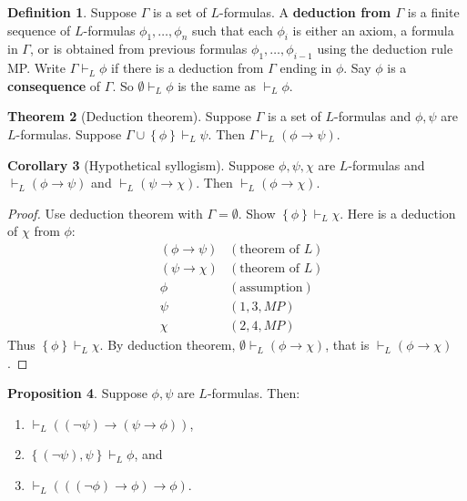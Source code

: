 \documentclass{article}
\newcommand{\rb}[1]{\left( #1 \right)}
\newcommand{\cb}[1]{\left\{ #1 \right\}}
\newcommand{\notb}[1]{\rb{\neg #1}}
\newcommand{\impb}[2]{\rb{#1 \rightarrow #2}}
\theoremstyle{definition}\newtheorem{definition}{Definition}[subsection]
\theoremstyle{definition}\newtheorem{remark}[definition]{Remark}
\theoremstyle{definition}\newtheorem*{example}{Example}
\theoremstyle{definition}\newtheorem*{note}{Note}
\newtheorem{proposition}[definition]{Proposition}
\newtheorem{theorem}[definition]{Theorem}
\newtheorem{corollary}[definition]{Corollary}
\begin{document}

\begin{definition}
Suppose $ \Gamma $ is a set of $ L $-formulas. A \textbf{deduction from $ \Gamma $} is a finite sequence of $ L $-formulas $ \phi_1, \dots, \phi_n $ such that each $ \phi_i $ is either an axiom, a formula in $ \Gamma $, or is obtained from previous formulas $ \phi_1, \dots, \phi_{i - 1} $ using the deduction rule MP. Write $ \Gamma \vdash_L \phi $ if there is a deduction from $ \Gamma $ ending in $ \phi $. Say $ \phi $ is a \textbf{consequence} of $ \Gamma $. So $ \emptyset \vdash_L \phi $ is the same as $ \vdash_L \phi $.
\end{definition}

\begin{theorem}[Deduction theorem]
\label{thm:dt}
Suppose $ \Gamma $ is a set of $ L $-formulas and $ \phi, \psi $ are $ L $-formulas. Suppose $ \Gamma \cup \cb{\phi} \vdash_L \psi $. Then $ \Gamma \vdash_L \impb{\phi}{\psi} $.
\end{theorem}

\begin{corollary}[Hypothetical syllogism]
Suppose $ \phi, \psi, \chi $ are $ L $-formulas and $ \vdash_L \impb{\phi}{\psi} $ and $ \vdash_L \impb{\psi}{\chi} $. Then $ \vdash_L \impb{\phi}{\chi} $.
\end{corollary}

\begin{proof}
Use deduction theorem with $ \Gamma = \emptyset $. Show $ \cb{\phi} \vdash_L \chi $. Here is a deduction of $ \chi $ from $ \phi $:
\begin{align*}
& \impb{\phi}{\psi} & \rb{\text{theorem of } L} \\
& \impb{\psi}{\chi} & \rb{\text{theorem of } L} \\
& \phi & \rb{\text{assumption}} \\
& \psi & \rb{1, 3, MP} \\
& \chi & \rb{2, 4, MP}
\end{align*}
Thus $ \cb{\phi} \vdash_L \chi $. By deduction theorem, $ \emptyset \vdash_L \impb{\phi}{\chi} $, that is $ \vdash_L \impb{\phi}{\chi} $.
\end{proof}

\begin{proposition}
\label{prop:1.2.7}
Suppose $ \phi, \psi $ are $ L $-formulas. Then:
\begin{enumerate}
\item $ \vdash_L \impb{\notb{\psi}}{\impb{\psi}{\phi}} $,
\item $ \cb{\notb{\psi}, \psi} \vdash_L \phi $, and
\item $ \vdash_L \impb{\impb{\notb{\phi}}{\phi}}{\phi} $.
\end{enumerate}
\end{proposition}
\end{document}
